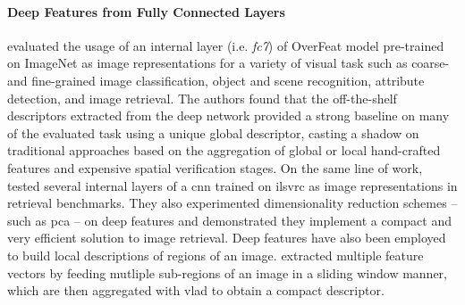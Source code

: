 \paragraph{Deep Features from Fully Connected Layers}
\citet{sharif2014cnn} evaluated the usage of an internal layer (i.e. \emph{fc7}) of OverFeat model pre-trained on ImageNet as image representations for a variety of visual task such as coarse- and fine-grained image classification, object and scene recognition, attribute detection, and image retrieval.
The authors found that the off-the-shelf descriptors extracted from the deep network provided a strong baseline on many of the evaluated task using a unique global descriptor, casting a shadow on traditional approaches based on the aggregation of global or local hand-crafted features and expensive spatial verification stages.
%
On the same line of work, \citet{babenko2014neural} tested several internal layers of a \gls{cnn} trained on \gls{ilsvrc} as image representations in retrieval benchmarks.
They also experimented dimensionality reduction schemes -- such as \gls{pca} -- on deep features and demonstrated they implement a compact and very efficient solution to image retrieval.
%
Deep features have also been employed to build local descriptions of regions of an image.
\citet{gong2014multi} extracted multiple feature vectors by feeding mutliple sub-regions of an image in a sliding window manner,  which are then aggregated with \gls{vlad} to obtain a compact descriptor.


